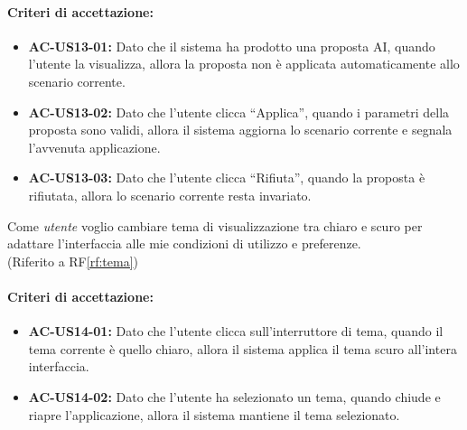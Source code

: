 \paragraph{Criteri di accettazione:}
\begin{itemize}
    \item \textbf{AC-US13-01:} Dato che il sistema ha prodotto una proposta AI, quando l'utente la visualizza, allora la proposta non è applicata automaticamente allo scenario corrente.
    \item \textbf{AC-US13-02:} Dato che l'utente clicca ``Applica'', quando i parametri della proposta sono validi, allora il sistema aggiorna lo scenario corrente e segnala l'avvenuta applicazione.
    \item \textbf{AC-US13-03:} Dato che l'utente clicca ``Rifiuta'', quando la proposta è rifiutata, allora lo scenario corrente resta invariato.
\end{itemize}

 \label{us:tema}
Come \textit{utente} voglio cambiare tema di visualizzazione tra chiaro e scuro per adattare l'interfaccia alle mie condizioni di utilizzo e preferenze. \\ (Riferito a RF\ref{rf:tema})

\paragraph{Criteri di accettazione:}
\begin{itemize}
    \item \textbf{AC-US14-01:} Dato che l'utente clicca sull'interruttore di tema, quando il tema corrente è quello chiaro, allora il sistema applica il tema scuro all'intera interfaccia.
    \item \textbf{AC-US14-02:} Dato che l'utente ha selezionato un tema, quando chiude e riapre l'applicazione, allora il sistema mantiene il tema selezionato.
\end{itemize}